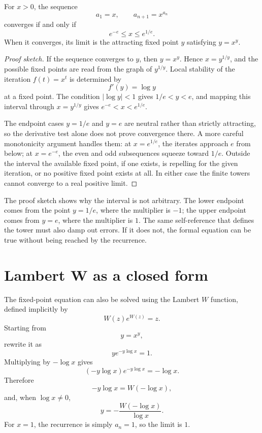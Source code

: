 \documentclass{essay}
\begin{document}
\begin{theorem}
  For \(x>0\), the sequence
  \[ a_{1}=x,\qquad a_{n+1}=x^{a_{n}} \]
  converges if and only if
  \[ e^{-e}\le x\le e^{1/e}. \]
  When it converges, its limit is the attracting fixed point \(y\) satisfying
  \(y=x^{y}\).
\end{theorem}

\begin{proof}[Proof sketch]
  If the sequence converges to \(y\), then \(y=x^{y}\). Hence
  \(x=y^{1/y}\), and the possible fixed points are read from the graph of
  \(y^{1/y}\). Local stability of the iteration \(f(t)=x^{t}\) is determined by
  \[ f'(y)=\log y \]
  at a fixed point. The condition \(|\log y|<1\) gives
  \(1/e<y<e\), and mapping this interval through \(x=y^{1/y}\) gives
  \(e^{-e}<x<e^{1/e}\).

  The endpoint cases \(y=1/e\) and \(y=e\) are neutral rather than strictly
  attracting, so the derivative test alone does not prove convergence there.
  A more careful monotonicity argument handles them: at \(x=e^{1/e}\), the
  iterates approach \(e\) from below; at \(x=e^{-e}\), the even and odd
  subsequences squeeze toward \(1/e\). Outside the interval the available fixed
  point, if one exists, is repelling for the given iteration, or no positive
  fixed point exists at all. In either case the finite towers cannot converge
  to a real positive limit.
\end{proof}

The proof sketch shows why the interval is not arbitrary. The lower endpoint
comes from the point \(y=1/e\), where the multiplier is \(-1\); the upper
endpoint comes from \(y=e\), where the multiplier is \(1\). The same
self-reference that defines the tower must also damp out errors. If it does
not, the formal equation can be true without being reached by the recurrence.

\section{Lambert W as a closed form}

The fixed-point equation can also be solved using the Lambert \(W\) function,
defined implicitly by
\[ W(z)e^{W(z)}=z. \]
Starting from
\[ y=x^{y}, \]
rewrite it as
\[ y e^{-y\log x}=1. \]
Multiplying by \(-\log x\) gives
\[ (-y\log x)e^{-y\log x}=-\log x. \]
Therefore
\[ -y\log x=W(-\log x), \]
and, when \(\log x\ne0\),
\[ y=-\frac{W(-\log x)}{\log x}. \]
For \(x=1\), the recurrence is simply \(a_{n}=1\), so the limit is \(1\).
\end{document}
